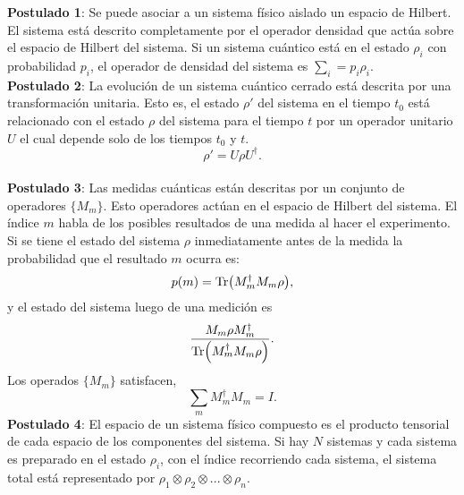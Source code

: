 \textbf{Postulado 1}: Se puede asociar a un sistema físico aislado un espacio de Hilbert. El sistema está descrito completamente por el operador densidad que actúa sobre el espacio de Hilbert del sistema. Si un sistema cuántico está en el estado $\rho_{i}$ con probabilidad $p_{i}$, el operador de densidad del sistema es $\sum_{i}= p_{i} \rho_{i}$.
\\

\textbf{Postulado 2}: La evolución de un sistema cuántico cerrado está descrita por una transformación unitaria. Esto es,  el estado $\rho'$ del sistema en el tiempo $t_{0}$ está relacionado con el estado $\rho$ del sistema para el tiempo $t$ por un operador unitario $U$ el cual depende solo de los tiempos $t_{0}$ y $t$. 
\begin{equation}
\rho' = U \rho U^{\dagger}.
\end{equation}
\\

\textbf{Postulado 3}: Las medidas cuánticas están descritas por un conjunto de operadores $ \{  M_{m} \}$. Esto operadores actúan en el espacio de Hilbert del sistema. El índice $m$ habla de los posibles resultados de una medida al hacer el experimento. Si se tiene el estado del sistema $\rho$ inmediatamente antes de la medida la probabilidad que el resultado $m$ ocurra es:
\begin{equation}
p(m)= \Tr (M^{\dagger}_{m}M_{m} \rho),
\end{equation}
y el estado del sistema luego de una medición es
\begin{equation}
\frac{M_{m} \rho M_{m}^{\dagger}}{\Tr(M^{\dagger}_{m}M_{m} \rho)}.
\end{equation}
Los operados $\{  M_{m} \}$ satisfacen,
\begin{equation}
\sum_{m} M^{\dagger}_{m}M_{m} = I.
\end{equation}
\textbf{Postulado 4}: El espacio de un sistema físico compuesto es el producto tensorial de cada espacio de los componentes del sistema. Si  hay $N$ sistemas y cada sistema es preparado en el estado $\rho_{i}$, con el índice recorriendo cada sistema, el sistema total está representado por $\rho_{1} \otimes \rho_{2} \otimes ...\otimes \rho_{n}$.







